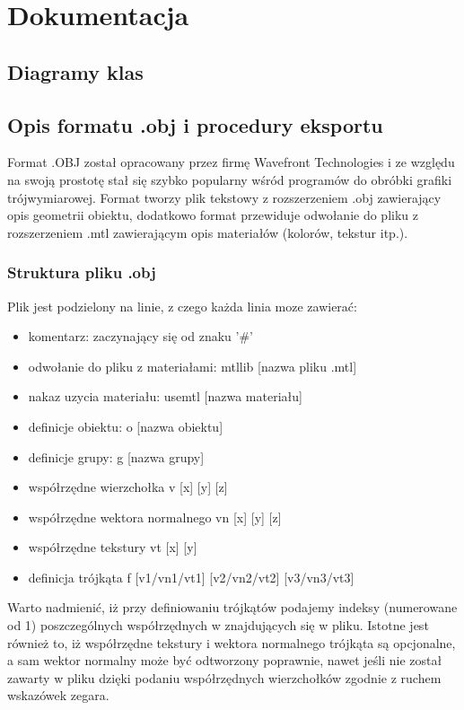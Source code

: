 \chapter{Dokumentacja}

\section{Diagramy klas}

\section{Opis formatu .obj i procedury eksportu}
Format .OBJ został opracowany przez firmę Wavefront Technologies i ze względu na swoją prostotę stał się szybko
popularny wśród programów do obróbki grafiki trójwymiarowej. Format tworzy plik tekstowy z rozszerzeniem .obj 
zawierający opis geometrii obiektu, dodatkowo format przewiduje odwołanie do pliku z rozszerzeniem .mtl zawierającym
opis materiałów (kolorów, tekstur itp.).
\subsection{Struktura pliku .obj}
Plik jest podzielony na linie, z czego każda linia moze zawierać:
\begin{itemize}
\item komentarz: zaczynający się od znaku '\#'
\item odwołanie do pliku z materiałami: mtllib [nazwa pliku .mtl]
\item nakaz uzycia materiału: usemtl [nazwa materiału]
\item definicje obiektu: o [nazwa obiektu]
\item definicje grupy: g [nazwa grupy]
\item współrzędne wierzchołka v [x] [y] [z]
\item współrzędne wektora normalnego vn [x] [y] [z]
\item współrzędne tekstury vt [x] [y]
\item definicja trójkąta f [v1/vn1/vt1] [v2/vn2/vt2] [v3/vn3/vt3]
\end{itemize}
Warto nadmienić, iż przy definiowaniu trójkątów podajemy indeksy (numerowane od 1) poszczególnych współrzędnych w znajdujących się w pliku.
Istotne jest również to, iż współrzędne tekstury i wektora normalnego trójkąta są opcjonalne, a sam wektor normalny może być odtworzony poprawnie,
nawet jeśli nie został zawarty w pliku dzięki podaniu współrzędnych wierzchołków zgodnie z ruchem wskazówek zegara.
